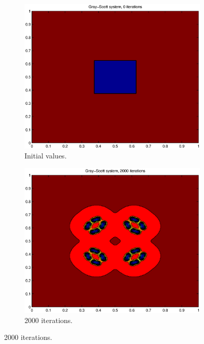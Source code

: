 \documentclass[a4paper,11pt]{article}
\begin{document}
\begin{figure}
    \centering
    \begin{subfigure}[b]{0.48\textwidth}
        \centering
        \includegraphics[width=\textwidth]{it_0}
        \caption{Initial values.}
        \label{fig:it_0}
    \end{subfigure}
    \hfill
    \begin{subfigure}[b]{0.48\textwidth}
        \centering
        \includegraphics[width=\textwidth]{it_2000}
        \caption{2000 iterations.}
        \label{fig:it_2000}
    \end{subfigure}

\end{figure}
\end{document}
